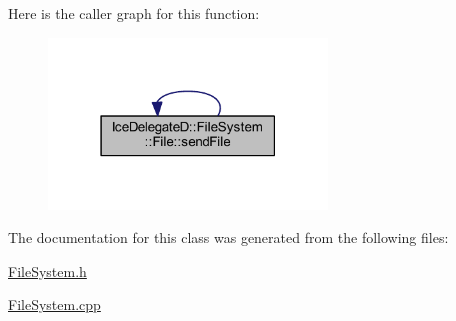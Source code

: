 Here is the caller graph for this function\+:
\nopagebreak
\begin{figure}[H]
\begin{center}
\leavevmode
\includegraphics[width=210pt]{class_ice_delegate_d_1_1_file_system_1_1_file_a219881647e8715fbf6e0f76d172b72b1_icgraph}
\end{center}
\end{figure}




The documentation for this class was generated from the following files\+:\begin{DoxyCompactItemize}
\item 
\hyperlink{_file_system_8h}{File\+System.\+h}\item 
\hyperlink{_file_system_8cpp}{File\+System.\+cpp}\end{DoxyCompactItemize}
